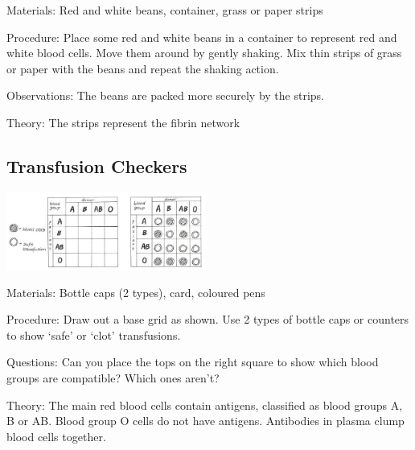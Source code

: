 \begin{multicols}{2}
\begin{description*}
\item[Materials:]{Red and white beans, container, grass or paper strips}
\item[Procedure:]{Place some red and white beans in a container to represent red and white blood cells.
Move them around by gently shaking. Mix thin strips of grass or paper with the beans and
repeat the shaking action. }
\item[Observations:]{The beans are packed more securely by the strips.}
\item[Theory:]{The strips
represent the fibrin network }
\end{description*}

\subsection{Transfusion Checkers} %

\begin{center}
\includegraphics[width=0.49\textwidth]{./img/vso/transfusion-checkers.jpg}
\end{center}

\begin{description*}
\item[Materials:]{Bottle caps (2 types), card, coloured pens}
\item[Procedure:]{Draw out a base grid as shown. Use 2 types of bottle caps or counters to
show `safe' or `clot' transfusions.}
\item[Questions:]{Can you place the tops on the right square to show which blood groups are compatible?
Which ones aren't?}
\item[Theory:]{The main red blood cells contain antigens, classified as blood groups A, B or AB. Blood
group O cells do not have antigens. Antibodies in plasma clump blood cells together.}
\end{description*}


\end{multicols}
